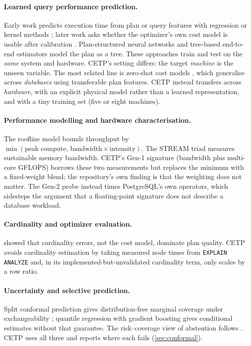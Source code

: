 \paragraph{Learned query performance prediction.}
Early work predicts execution time from plan or query features with regression or kernel methods
\citep{ganapathi:multiple,akdere:learning}; later work asks whether the optimizer's own cost model is
usable after calibration \citep{wu:costmodels}. Plan-structured neural networks \citep{marcus:planstructured}
and tree-based end-to-end estimators \citep{sun:endtoend} model the plan as a tree. These approaches
train and test on the \emph{same} system and hardware. CETP's setting differs: the target
\emph{machine} is the unseen variable. The most related line is zero-shot cost models
\citep{hilprecht:zeroshot}, which generalise across \emph{databases} using transferable plan features. CETP
instead transfers across \emph{hardware}, with an explicit physical model rather than a learned
representation, and with a tiny training set (five or eight machines).

\paragraph{Performance modelling and hardware characterisation.}
The roofline model \citep{williams:roofline} bounds throughput by $\min(\text{peak compute},\,\text{bandwidth}\times\text{intensity})$.
The STREAM triad \citep{mccalpin:stream} measures sustainable memory bandwidth. CETP's Gen-1
signature (bandwidth plus multi-core GFLOPS) borrows these two measurements but replaces the minimum
with a fixed-weight blend; the repository's own finding is that the weighting does not matter. The
Gen-2 probe instead times PostgreSQL's own operators, which sidesteps the argument that a
floating-point signature does not describe a database workload.

\paragraph{Cardinality and optimizer evaluation.}
\citet{leis:howgood} showed that cardinality errors, not the cost model, dominate plan quality. CETP
avoids cardinality estimation by taking measured node times from \texttt{EXPLAIN ANALYZE} and, in its
implemented-but-unvalidated cardinality term, only scales by a row ratio.

\paragraph{Uncertainty and selective prediction.}
Split conformal prediction gives distribution-free marginal coverage under exchangeability
\citep{angelopoulos:gentle}; quantile regression with gradient boosting \citep{friedman:gbm} gives
conditional estimates without that guarantee. The risk--coverage view of abstention follows
\citet{geifman:selective}. CETP uses all three and reports where each fails (\cref{sec:conformal}).

